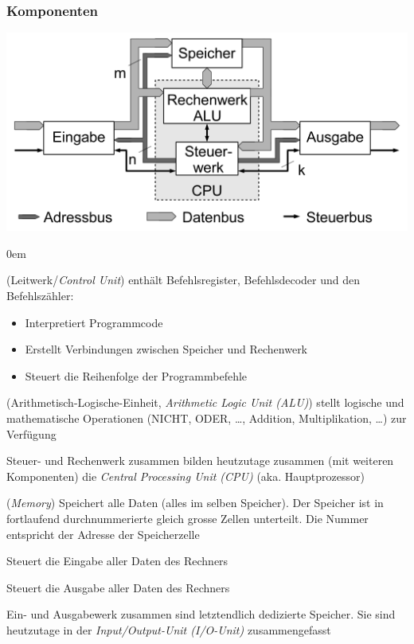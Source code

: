 \subsubsection{Komponenten}
\includegraphics[width=\linewidth]{von_Neumann-_Architektur_de.png}
\begin{description}\itemsep0em
	\item [Steuerwerk] (Leitwerk/\textit{Control Unit}) enthält Befehlsregister, Befehlsdecoder und den Befehlszähler:
	\begin{itemize}
		\item Interpretiert Programmcode
		\item Erstellt Verbindungen zwischen Speicher und Rechenwerk
		\item Steuert die Reihenfolge der Programmbefehle
	\end{itemize}

	\item [Rechenwerk] (Arithmetisch-Logische-Einheit, \textit{Arithmetic Logic Unit (ALU)}) stellt logische und mathematische Operationen (NICHT, ODER, \dots, Addition, Multiplikation, \dots) zur Verfügung

	Steuer- und Rechenwerk zusammen bilden heutzutage zusammen (mit weiteren Komponenten) die \textit{Central Processing Unit (CPU)} (aka. Hauptprozessor)

	\item [Speicher(werk)] (\textit{Memory}) Speichert alle Daten (alles im selben Speicher). Der Speicher ist in fortlaufend durchnummerierte gleich grosse Zellen unterteilt. Die Nummer entspricht der Adresse der Speicherzelle
	\item [Eingabewerk] Steuert die Eingabe aller Daten des Rechners 
	\item [Ausgabewerk] Steuert die Ausgabe aller Daten des Rechners

	Ein- und Ausgabewerk zusammen sind letztendlich dedizierte Speicher. Sie sind heutzutage in der \textit{Input/Output-Unit (I/O-Unit)} zusammengefasst
\end{description}

